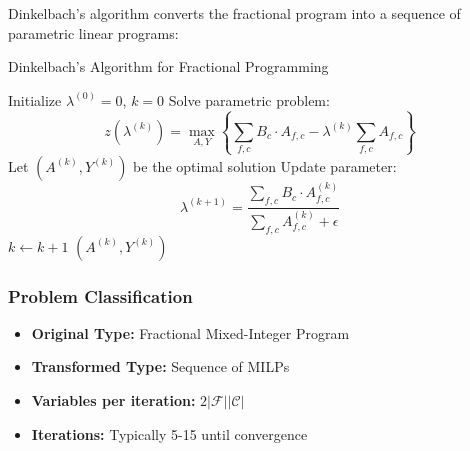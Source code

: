 \documentclass{article}
\begin{document}
Dinkelbach's algorithm converts the fractional program into a sequence of parametric linear programs:

\begin{algorithm}[H]
\caption{Dinkelbach's Algorithm for Fractional Programming}
\begin{algorithmic}[1]
\State Initialize $\lambda^{(0)} = 0$, $k = 0$
\Repeat
    \State Solve parametric problem:
    \begin{equation*}
    z(\lambda^{(k)}) = \max_{A,Y} \left\{\sum_{f,c} B_c \cdot A_{f,c} - \lambda^{(k)} \sum_{f,c} A_{f,c}\right\}
    \end{equation*}
    \State Let $(A^{(k)}, Y^{(k)})$ be the optimal solution
    \State Update parameter:
    \begin{equation*}
    \lambda^{(k+1)} = \frac{\sum_{f,c} B_c \cdot A^{(k)}_{f,c}}{\sum_{f,c} A^{(k)}_{f,c} + \epsilon}
    \end{equation*}
    \State $k \leftarrow k + 1$
\State \Return $(A^{(k)}, Y^{(k)})$
\end{algorithmic}
\end{algorithm}


\subsubsection{Problem Classification}
\begin{itemize}
    \item \textbf{Original Type:} Fractional Mixed-Integer Program
    \item \textbf{Transformed Type:} Sequence of MILPs
    \item \textbf{Variables per iteration:} $2|\mathcal{F}||\mathcal{C}|$
    \item \textbf{Iterations:} Typically 5-15 until convergence
\end{itemize}


\end{document}
